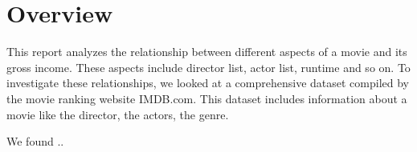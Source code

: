 \section{Overview}
    This report analyzes the relationship between different aspects of a movie and
        its gross income.
    These aspects include director list, actor list, runtime and so on.
    To investigate these relationships, we looked at a comprehensive dataset
        compiled by the movie ranking website IMDB.com.
    This dataset includes information about a movie like the director, the actors,
        the genre.

    We found ..
